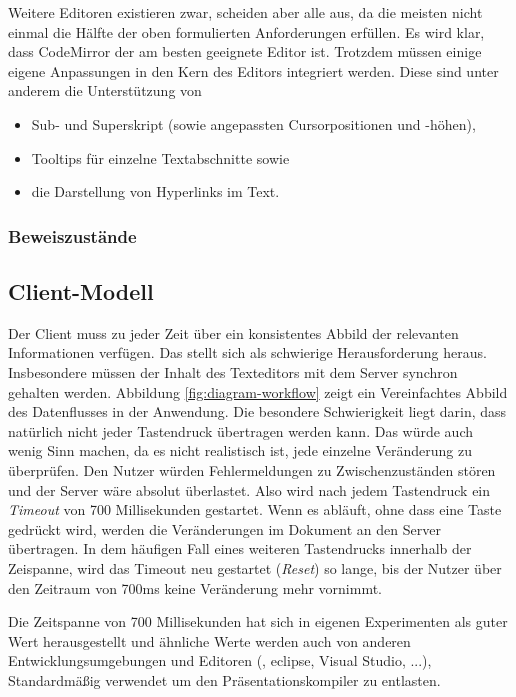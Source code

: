 Weitere Editoren existieren zwar, scheiden aber alle aus, da die meisten nicht einmal die Hälfte der
oben formulierten Anforderungen erfüllen. Es wird klar, dass CodeMirror der am besten geeignete
Editor ist. Trotzdem müssen einige eigene Anpassungen in den Kern des Editors integriert werden.
Diese sind unter anderem die Unterstützung von

\begin{itemize}
  \item Sub- und Superskript (sowie angepassten Cursorpositionen und -höhen),
  \item Tooltips für einzelne Textabschnitte sowie
  \item die Darstellung von Hyperlinks im Text.
\end{itemize}

\subsubsection{Beweiszustände}

\subsection{Client-Modell}

Der Client muss zu jeder Zeit über ein konsistentes Abbild der relevanten Informationen verfügen.
Das stellt sich als schwierige Herausforderung heraus. Insbesondere müssen der Inhalt des
Texteditors mit dem Server synchron gehalten werden. Abbildung \ref{fig:diagram-workflow} zeigt ein
Vereinfachtes Abbild des Datenflusses in der Anwendung. Die besondere Schwierigkeit liegt darin,
dass natürlich nicht jeder Tastendruck übertragen werden kann. Das würde auch wenig Sinn machen, da
es nicht realistisch ist, jede einzelne Veränderung zu überprüfen. Den Nutzer würden Fehlermeldungen
zu Zwischenzuständen stören und der Server wäre absolut überlastet. Also wird nach jedem Tastendruck
ein \textit{Timeout} von 700 Millisekunden gestartet. Wenn es abläuft, ohne dass eine Taste gedrückt
wird, werden die Veränderungen im Dokument an den Server übertragen. In dem häufigen Fall eines
weiteren Tastendrucks innerhalb der Zeispanne, wird das Timeout neu gestartet (\textit{Reset}) so
lange, bis der Nutzer über den Zeitraum von 700ms keine Veränderung mehr vornimmt.

Die Zeitspanne von 700 Millisekunden hat sich in eigenen Experimenten als guter Wert herausgestellt
und ähnliche Werte werden auch von anderen Entwicklungsumgebungen und Editoren (, eclipse,
Visual Studio, ...), Standardmäßig verwendet um den Präsentationskompiler zu entlasten.

